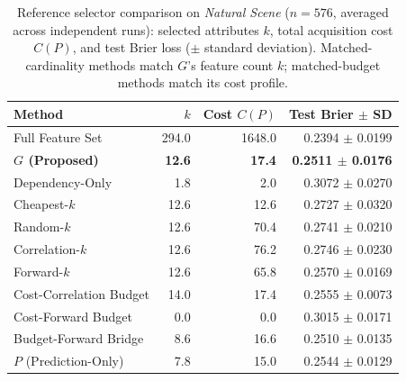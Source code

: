 \begin{table}[htbp]
	\centering\small\renewcommand{\arraystretch}{1.25}\setlength{\tabcolsep}{6pt}
	\caption{Reference selector comparison on \textit{Natural Scene} ($n=576$, averaged across independent runs): selected attributes $k$, total acquisition cost $C(P)$, and test Brier loss ($\pm$ standard deviation). Matched-cardinality methods match $G$'s feature count $k$; matched-budget methods match its cost profile.}
	\label{tab:baselines-main}
	\begin{tabular}{l rrr}\hline
		Method & $k$ & Cost $C(P)$ & Test Brier $\pm$ SD\\\hline
		Full Feature Set & 294.0 & 1648.0 & 0.2394 $\pm$ 0.0199\\
		\textbf{$G$ (Proposed)} & \textbf{12.6} & \textbf{17.4} & \textbf{0.2511 $\pm$ 0.0176}\\
		Dependency-Only & 1.8 & 2.0 & 0.3072 $\pm$ 0.0270\\
		Cheapest-$k$ & 12.6 & 12.6 & 0.2727 $\pm$ 0.0320\\
		Random-$k$ & 12.6 & 70.4 & 0.2741 $\pm$ 0.0210\\
		Correlation-$k$ & 12.6 & 76.2 & 0.2746 $\pm$ 0.0230\\
		Forward-$k$ & 12.6 & 65.8 & 0.2570 $\pm$ 0.0169\\
		Cost-Correlation Budget & 14.0 & 17.4 & 0.2555 $\pm$ 0.0073\\
		Cost-Forward Budget & 0.0 & 0.0 & 0.3015 $\pm$ 0.0171\\
		Budget-Forward Bridge & 8.6 & 16.6 & 0.2510 $\pm$ 0.0135\\
		$P$ (Prediction-Only) & 7.8 & 15.0 & 0.2544 $\pm$ 0.0129\\
		\hline\end{tabular}
\end{table}

